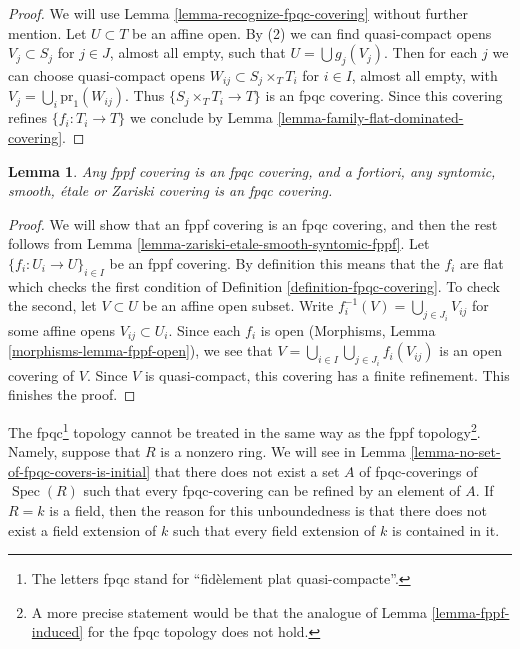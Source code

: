 \documentclass{stacks-project}
\theoremstyle{plain}
\newtheorem{lemma}[subsection]{Lemma}
\theoremstyle{definition}
\theoremstyle{remark}
\numberwithin{equation}{subsection}
\def\Spec{\mathop{\mathrm{Spec}}}
\begin{document}
\begin{proof}
We will use Lemma \ref{lemma-recognize-fpqc-covering} without further
mention. Let $U \subset T$ be an affine open. By (2) we can find
quasi-compact opens $V_j \subset S_j$ for $j \in J$, almost all empty, such that
$U = \bigcup g_j(V_j)$. Then for each $j$ we can choose quasi-compact
opens $W_{ij} \subset S_j \times_T T_i$ for $i \in I$, almost all empty,
with $V_j = \bigcup_i \text{pr}_1(W_{ij})$. Thus
$\{S_j \times_T T_i \to T\}$ is an fpqc covering.
Since this covering refines $\{f_i : T_i \to T\}$ we conclude by
Lemma \ref{lemma-family-flat-dominated-covering}.
\end{proof}

\begin{lemma}
\label{lemma-zariski-etale-smooth-syntomic-fppf-fpqc}
Any fppf covering is an fpqc covering, and a fortiori,
any syntomic, smooth, \'etale or Zariski covering is an fpqc covering.
\end{lemma}

\begin{proof}
We will show that an fppf covering is an fpqc covering, and then the
rest follows from
Lemma \ref{lemma-zariski-etale-smooth-syntomic-fppf}.
Let $\{f_i : U_i \to U\}_{i \in I}$ be an fppf covering.
By definition this means that the $f_i$ are flat which checks the first
condition of Definition \ref{definition-fpqc-covering}. To check the
second, let $V \subset U$ be an affine open subset.
Write $f_i^{-1}(V) = \bigcup_{j \in J_i} V_{ij}$
for some affine opens $V_{ij} \subset U_i$. Since each $f_i$ is open
(Morphisms, Lemma \ref{morphisms-lemma-fppf-open}), we see that
$V = \bigcup_{i\in I} \bigcup_{j \in J_i} f_i(V_{ij})$
is an open covering of $V$.
Since $V$ is quasi-compact, this covering has a finite
refinement. This finishes the proof.
\end{proof}

\noindent
The fpqc\footnote{The letters fpqc stand for
``fid\`element plat quasi-compacte''.}
topology cannot be treated in the same way as the fppf
topology\footnote{A more precise statement would be that the analogue of
Lemma \ref{lemma-fppf-induced} for the fpqc topology does not hold.}.
Namely, suppose that $R$ is a nonzero ring. We will see in
Lemma \ref{lemma-no-set-of-fpqc-covers-is-initial}
that there does not exist a set $A$ of fpqc-coverings of $\Spec(R)$
such that every fpqc-covering can be refined by an element of $A$.
If $R = k$ is a field, then the reason for this unboundedness is that
there does not exist a field extension of $k$ such that every field extension
of $k$ is contained in it.
\end{document}
